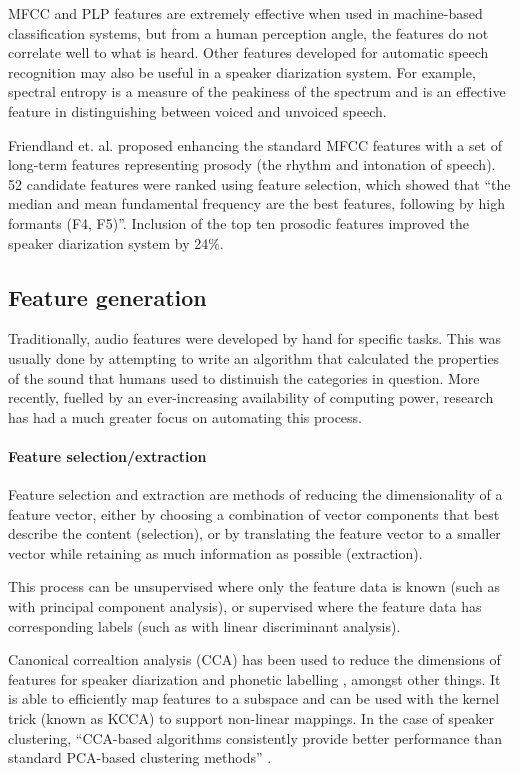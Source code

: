MFCC and PLP features are extremely effective when used in machine-based
classification systems, but from a human perception angle, the features do not
correlate well to what is heard.  Other features developed for automatic speech
recognition may also be useful in a speaker diarization system. For example,
spectral entropy \cite{Misra2004} is a measure of the peakiness of the spectrum
and is an effective feature in distinguishing between voiced and unvoiced
speech.

Friendland et. al. \cite{Friedland2009} proposed enhancing the standard MFCC
features with a set of long-term features representing prosody (the rhythm and
intonation of speech). 52 candidate features were ranked using feature
selection, which showed that ``the median and mean fundamental frequency are
the best features, following by high formants (F4, F5)''. Inclusion of the
top ten prosodic features improved the speaker diarization system by 24\%.

\subsection{Feature generation}\label{sec:litreviewgeneration}
Traditionally, audio features were developed by hand for specific tasks. This
was usually done by attempting to write an algorithm that calculated the
properties of the sound that humans used to distinuish the categories in
question. More recently, fuelled by an ever-increasing availability of
computing power, research has had a much greater focus on automating
this process.

\paragraph{Feature selection/extraction}
Feature selection and extraction are methods of reducing the dimensionality of
a feature vector, either by choosing a combination of vector components that
best describe the content (selection), or by translating the feature vector to
a smaller vector while retaining as much information as possible (extraction).

This process can be unsupervised where only the feature data is known (such as
with principal component analysis), or supervised where the feature data has
corresponding labels (such as with linear discriminant analysis).

Canonical correaltion analysis (CCA) has been used to reduce the dimensions of
features for speaker diarization \cite{Chaudhuri2009} and phonetic labelling
\cite{Arora2014}, amongst other things. It is able to efficiently map features
to a subspace and can be used with the kernel trick (known as KCCA) to support
non-linear mappings. In the case of speaker clustering, ``CCA-based algorithms
consistently provide better performance than standard PCA-based clustering
methods'' \cite{Chaudhuri2009}.

